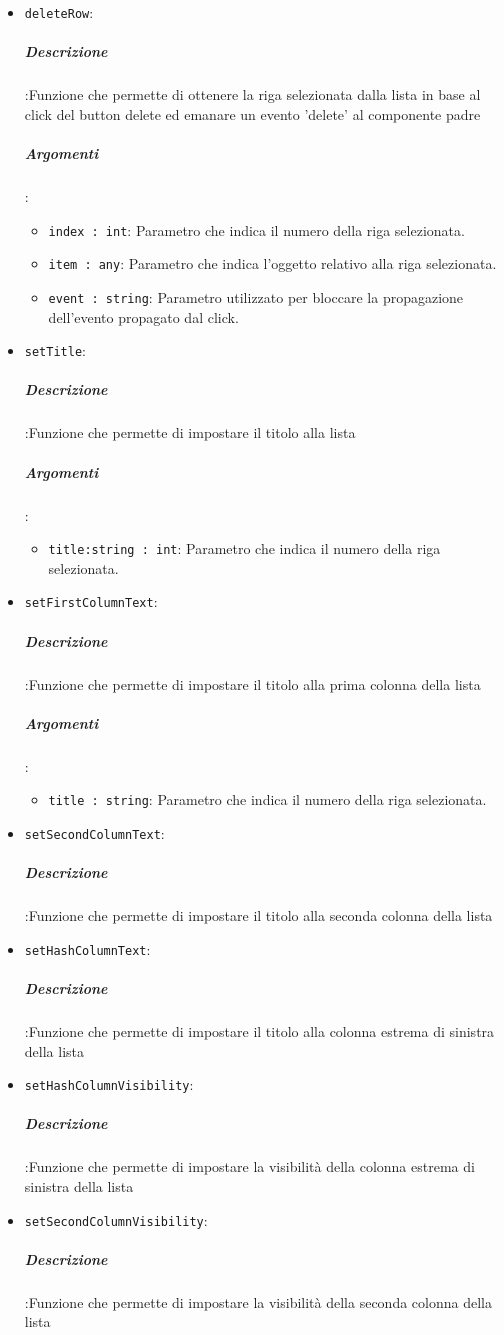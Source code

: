 \documentclass[../DefinizioneDiProdotto_v2.0.0.tex]{subfiles}
\begin{document}
\begin{itemize}
			      	      	\item \texttt{deleteRow}:
							\subparagraph{Descrizione}:Funzione che permette di ottenere la riga selezionata dalla lista in base al click del button delete ed emanare un evento 'delete' al componente padre
			      	      	\subparagraph{Argomenti}:
			      	      	      \begin{itemize}
			      	      	      	\item \texttt{index : int}: Parametro che indica il numero della riga selezionata.
			      	      	      	\item \texttt{item : any}: Parametro che indica l'oggetto relativo alla riga selezionata.
			      	      	      	\item \texttt{event : string}: Parametro utilizzato per bloccare la propagazione dell'evento propagato dal click.
			      	      	      \end{itemize}
			      	      	\item \texttt{setTitle}:
							\subparagraph{Descrizione}:Funzione che permette di impostare il titolo alla lista
							\subparagraph{Argomenti}:
			      	      	      \begin{itemize}
			      	      	      	\item \texttt{title:string : int}: Parametro che indica il numero della riga selezionata.
			      	      	      \end{itemize}
			      	      	\item \texttt{setFirstColumnText}:
							\subparagraph{Descrizione}:Funzione che permette di impostare il titolo alla prima colonna della lista
							\subparagraph{Argomenti}:
			      	      	      \begin{itemize}
			      	      	      	\item \texttt{title : string}: Parametro che indica il numero della riga selezionata.
			      	      	      \end{itemize}
			      	      	\item \texttt{setSecondColumnText}:
							\subparagraph{Descrizione}:Funzione che permette di impostare il titolo alla seconda colonna della lista

			      	      	\item \texttt{setHashColumnText}:
							\subparagraph{Descrizione}:Funzione che permette di impostare il titolo alla colonna estrema di sinistra della lista

			      	      	\item \texttt{setHashColumnVisibility}:
							\subparagraph{Descrizione}:Funzione che permette di impostare la visibilità della colonna estrema di sinistra della lista
			      	      	\item \texttt{setSecondColumnVisibility}:
							\subparagraph{Descrizione}:Funzione che permette di impostare la visibilità della seconda colonna della lista
			      \end{itemize}
\end{document}
